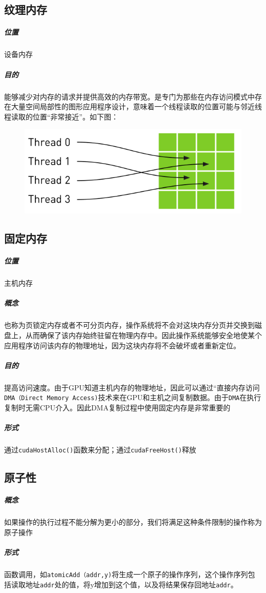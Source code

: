 \documentclass[UTF8,a4paper,12pt]{ctexbook}
\begin{document}
		\subsection{纹理内存}
			\subparagraph{位置}设备内存
			\subparagraph{目的}能够减少对内存的请求并提供高效的内存带宽。是专门为那些在内存访问模式中存在大量空间局部性的图形应用程序设计，意味着一个线程读取的位置可能与邻近线程读取的位置“非常接近”。如下图：
				\begin{figure}[h]
					\centering
					\includegraphics[scale = 0.7]{TextureMem.png}
				\end{figure}
				
		\subsection{固定内存}
			\subparagraph{位置}主机内存
			\subparagraph{概念}也称为页锁定内存或者不可分页内存，操作系统将不会对这块内存分页并交换到磁盘上，从而确保了该内存始终驻留在物理内存中。因此操作系统能够安全地使某个应用程序访问该内存的物理地址，因为这块内存将不会破坏或者重新定位。
			
			\subparagraph{目的}提高访问速度。由于GPU知道主机内存的物理地址，因此可以通过“直接内存访问\verb|DMA（Direct Memory Access)|技术来在GPU和主机之间复制数据。由于\verb|DMA|在执行复制时无需CPU介入。因此DMA复制过程中使用固定内存是非常重要的
			
			\subparagraph{形式}通过\verb|cudaHostAlloc()|函数来分配；通过\verb|cudaFreeHost()|释放
		
		\subsection{原子性}
			\subparagraph{概念}如果操作的执行过程不能分解为更小的部分，我们将满足这种条件限制的操作称为原子操作
			
			\subparagraph{形式}函数调用，如\verb|atomicAdd（addr,y)|将生成一个原子的操作序列，这个操作序列包括读取地址\verb|addr|处的值，将y增加到这个值，以及将结果保存回地址\verb|addr|。
			
\end{document}
